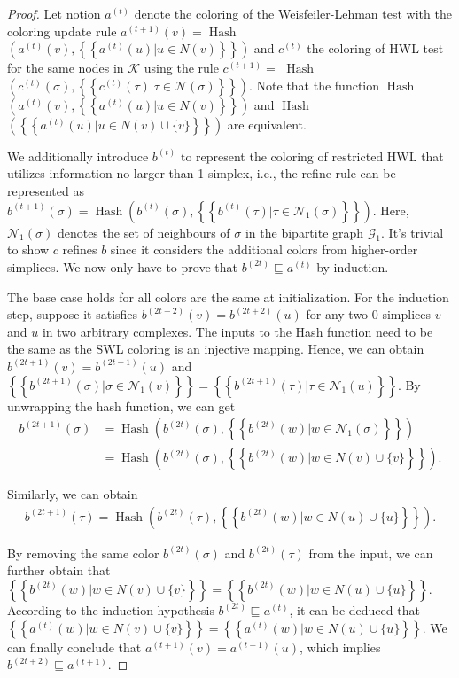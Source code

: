 \documentclass[letterpaper]{article} \usepackage{aaai24}
\newcommand \multiset[1] {\left\{\!\!\left\{#1\right\}\!\!\right\} }
\theoremstyle{plain}
\theoremstyle{definition}
\theoremstyle{remark}
\begin{document}
\begin{proof}
\label{proof:HWL}
Let notion $a^{(t)}$ denote the coloring of the Weisfeiler-Lehman test with the coloring update rule  $ a^{(t+1)}(v)=\operatorname{Hash}$ $ \left(a^{(t)}(v), \multiset{a^{(t)}(u) | u \in N(v)} \right)$ and $c^{(t)}$ the coloring of HWL test for the same nodes in $\mathcal{K}$ using the rule $c^{(t+1)}=$ $\operatorname{Hash}$ $\left( c^{(t)}(\sigma), \multiset{c^{(t)}(\tau) | \tau \in \mathcal{N}(\sigma)} \right)$.  Note that the function $\operatorname{Hash}$ $ \left(a^{(t)}(v), \multiset{a^{(t)}(u) | u \in N(v)} \right)$ and $\operatorname{Hash}$  $ \left(\multiset{a^{(t)}(u) | u \in N(v)\cup \{v\} }\right)$ are equivalent.

We additionally introduce $b^{(t)}$ to represent the coloring of restricted HWL that utilizes information no larger than 1-simplex, i.e., the refine rule can be represented as $b^{(t+1)}(\sigma) = \operatorname{Hash}\left( b^{(t)}(\sigma), \multiset{b^{(t)}(\tau) | \tau \in \mathcal{N}_1(\sigma)} \right)$. Here, $\mathcal{N}_1(\sigma)$ denotes the set of neighbours of $\sigma$ in the bipartite graph $\mathcal{G}_1$.  It's trivial to show $c$ refines $b$ since it considers the additional colors from higher-order simplices. We now only have to prove that $b^{(2t)} \sqsubseteq a^{(t)}$ by induction.

The base case holds for all colors are the same at initialization.
For the induction step, suppose it satisfies $b^{(2t+2)}(v) = b^{(2t+2)}(u)$ for any two 0-simplices $v$ and $u$ in two arbitrary complexes. 
The inputs to the Hash function need to be the same as the SWL coloring is an injective mapping.
Hence, we can obtain $b^{(2t+1)}(v)=b^{(2t+1)}(u)$ and $\multiset{b^{(2t+1)}(\sigma)|\sigma \in \mathcal{N}_1(v) } = \multiset{b^{(2t+1)}(\tau)|\tau \in \mathcal{N}_1(u) }$.  By unwrapping the hash function, we can get
 \begin{equation}
    \begin{split}
       b^{(2t+1)}(\sigma) 
     & = \operatorname{Hash}\left(b^{(2t)}(\sigma), \multiset{b^{(2t)}(w)|w \in \mathcal{N}_1(\sigma)} \right)\\
     & =\operatorname{Hash}\left(b^{(2t)}(\sigma), \multiset{b^{(2t)}(w)|w \in N(v)\cup \{v\}}\right).
    \end{split}
\end{equation}

Similarly, we can obtain 
\begin{align}
    b^{(2t+1)}(\tau) = \operatorname{Hash}\left(b^{(2t)}(\tau),\multiset{b^{(2t)}(w)|w \in N(u)\cup \{u\}}\right).
\end{align}

By removing the same color $b^{(2t)}(\sigma)$ and $b^{(2t)}(\tau)$ from the input, we can further obtain that  $\multiset{b^{(2t)}(w)|w \in N(v)\cup\{v\}} = \multiset{b^{(2t)}(w)|w \in N(u)\cup\{u\}}$. According to the induction hypothesis $b^{(2t)} \sqsubseteq a^{(t)}$, it can be deduced that $\multiset{a^{(t)}(w)|w \in N(v)\cup\{v\}} = \multiset{a^{(t)}(w)|w \in N(u)\cup\{u\}}$. We can finally conclude that $a^{(t+1)}(v)=a^{(t+1)}(u)$, which implies $b^{(2t+2)} \sqsubseteq a^{(t+1)}$.
\end{proof}
\end{document}
